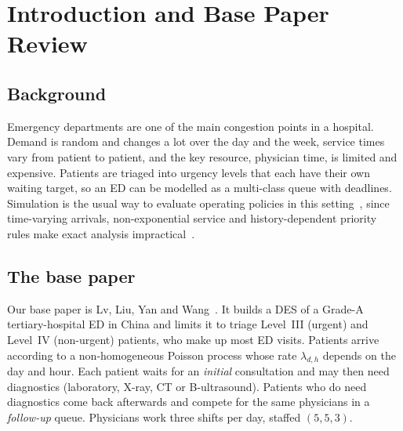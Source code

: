 \documentclass[sigconf,nonacm]{acmart}
\begin{document}


\maketitle

\section{Introduction and Base Paper Review}

\subsection{Background}
Emergency departments are one of the main congestion points in a hospital.
Demand is random and changes a lot over the day and the week, service times
vary from patient to patient, and the key resource, physician time, is limited
and expensive. Patients are triaged into urgency levels that each have their
own waiting target, so an ED can be modelled as a multi-class queue with
deadlines. Simulation is the usual way to evaluate operating policies in this
setting~\cite{vanbrabant2019kpi,wang2023simopt}, since time-varying arrivals,
non-exponential service and history-dependent priority rules make exact
analysis impractical~\cite{huang2015control}.

\subsection{The base paper}
Our base paper is Lv, Liu, Yan and Wang~\cite{lv2026des}. It builds a DES of a
Grade-A tertiary-hospital ED in China and limits it to triage Level~III
(urgent) and Level~IV (non-urgent) patients, who make up most ED visits.
Patients arrive according to a non-homogeneous Poisson process whose rate
$\lambda_{d,h}$ depends on the day and hour. Each patient waits for an
\emph{initial} consultation and may then need diagnostics (laboratory, X-ray,
CT or B-ultrasound). Patients who do need diagnostics come back afterwards and
compete for the same physicians in a \emph{follow-up} queue. Physicians work
three shifts per day, staffed $(5,5,3)$.
\end{document}
